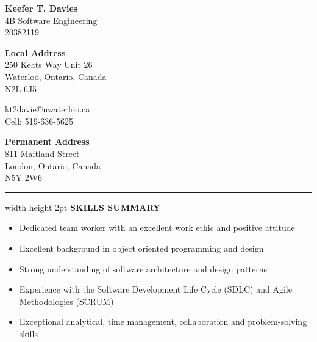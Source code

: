 \documentclass[10pt,letterpaper]{article}
\begin{document}
\begin{center}
    {\Large \textbf{Keefer T. Davies}}\\		
    4B Software Engineering\\
    20382119
\end{center}
\begin{minipage}{0.33\columnwidth}
    \textbf{Local Address}\\
    250 Keats Way Unit 26\\		
    Waterloo, Ontario, Canada\\		
    N2L 6J5
\end{minipage}
\begin{minipage}{0.33\columnwidth}
    \begin{center}
	kt2davie@uwaterloo.ca\\			
	Cell: 519-636-5625
    \end{center}
\end{minipage}
\begin{minipage}{0.33\columnwidth}
    \begin{adjustwidth}{0.25\columnwidth}{}
	{\textbf{Permanent Address}}\\			
	811 Maitland Street\\			
	London, Ontario, Canada\\			
	N5Y 2W6
    \end{adjustwidth}
\end{minipage}
\vspace{1em}
\hrule width \hsize height 2pt 
\vspace{1em}
\noindent \textbf{SKILLS SUMMARY} \hrulefill \\
\begin{adjustwidth}{0.1in}{0.5in}    
    \begin{itemize}
    \item Dedicated team worker with an excellent work ethic and positive attitude
	\item Excellent background in object oriented programming and design
	\item Strong understanding of software architecture and design patterns
	\item Experience with the Software Development Life Cycle (SDLC) and Agile Methodologies (SCRUM)
	\item Exceptional analytical, time management, collaboration and problem-solving skills
    \end{itemize}
\end{adjustwidth}
\vspace{1em}
\end{document}
